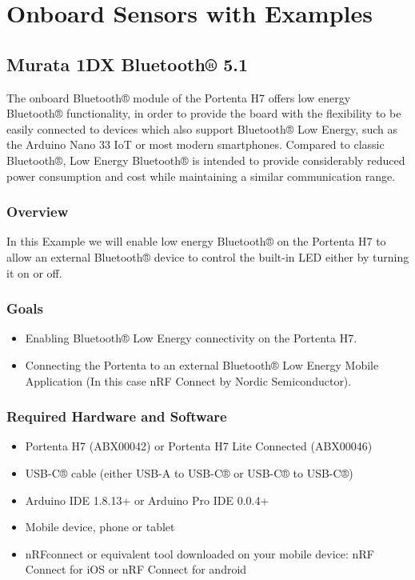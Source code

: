 \section{Onboard Sensors with Examples}

	\subsection{Murata 1DX Bluetooth® 5.1}
		The onboard Bluetooth® module of the Portenta H7 offers low energy Bluetooth® functionality, in order to provide the board with the flexibility to be easily connected to devices which also support Bluetooth® Low Energy, such as the Arduino Nano 33 IoT or most modern smartphones. Compared to classic Bluetooth®, Low Energy Bluetooth® is intended to provide considerably reduced power consumption and cost while maintaining a similar communication range. \cite{bluetoothPortentaH7:2024}
		
		\subsubsection{Overview}
			In this Example we will enable low energy Bluetooth® on the Portenta H7 to allow an external Bluetooth® device to control the built-in LED either by turning it on or off.
	
		\subsubsection{Goals}
			\begin{itemize}
				\item Enabling Bluetooth® Low Energy connectivity on the Portenta H7.
				\item Connecting the Portenta to an external Bluetooth® Low Energy Mobile Application (In this case nRF Connect by Nordic Semiconductor).
			\end{itemize}
			
		\subsubsection{Required Hardware and Software}
			\begin{itemize}
				\item Portenta H7 (ABX00042) or Portenta H7 Lite Connected (ABX00046)
				\item USB-C® cable (either USB-A to USB-C® or USB-C® to USB-C®)
				\item Arduino IDE 1.8.13+ or Arduino Pro IDE 0.0.4+
				\item Mobile device, phone or tablet
				\item nRFconnect or equivalent tool downloaded on your mobile device: nRF Connect for iOS or nRF Connect for android
			\end{itemize}
			
